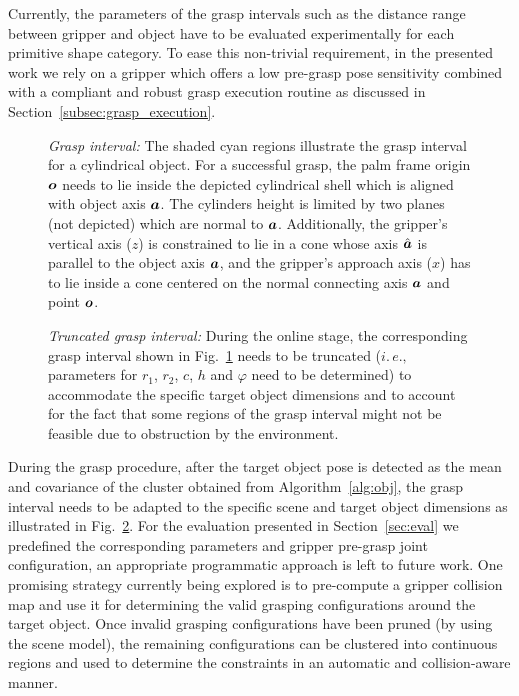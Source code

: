 Currently, the parameters of the grasp intervals such as the distance range between gripper and
object have to be evaluated experimentally for each primitive shape category. To ease this
non-trivial requirement, in the presented work we rely on a gripper which offers a low pre-grasp
pose sensitivity combined with a compliant and robust grasp execution routine as discussed in
Section~\ref{subsec:grasp_execution}.
%
\begin{figure}[t!] 
   \centering
     
    \caption{\textit{Grasp interval:} The shaded cyan regions illustrate the grasp interval for a
      cylindrical object. For a successful grasp, the palm frame origin $\mbox{\boldmath $o$}$ needs to lie
      inside the depicted cylindrical shell which is aligned with object axis $\mbox{\boldmath $a$}$. The
      cylinders height is limited by two planes (not depicted) which are normal to
      $\mbox{\boldmath $a$}$. Additionally, the gripper's vertical axis ($z$) is constrained to lie in a cone
      whose axis $\hat{\mbox{\boldmath $a$}}$ is parallel to the object axis $\mbox{\boldmath $a$}$, and the gripper's
      approach axis ($x$) has to lie inside a cone centered on the normal connecting axis $\mbox{\boldmath $a$}$
      and point $\mbox{\boldmath $o$}$.}
   \label{fig:grasp_interval}
   \vspace{-0.5cm}
\end{figure}
%
\begin{figure}[t!] 
   \centering
     
    \caption{\textit{Truncated grasp interval:} During the online stage, the corresponding grasp
      interval shown in Fig.~\ref{fig:grasp_interval} needs to be truncated ($i.\,e.,$ parameters
      for $r_1$, $r_2$, $c$, $h$ and $\varphi$ need to be determined) to accommodate the specific
      target object dimensions and to account for the fact that some regions of the grasp interval
      might not be feasible due to obstruction by the environment.}
   \label{fig:truncated_grasp_interval}
\end{figure}

During the grasp procedure, after the target object pose is detected as the mean and covariance of
the cluster obtained from Algorithm~\ref{alg:obj}, the grasp
interval needs to be adapted to the specific scene and target object dimensions as illustrated in
Fig.~\ref{fig:truncated_grasp_interval}. For the evaluation presented in Section~\ref{sec:eval} we
predefined the corresponding parameters and gripper pre-grasp joint configuration, an appropriate
programmatic approach is left to future work. 
One promising strategy currently being explored is to pre-compute a gripper collision map and use it for determining the valid grasping configurations around the target object. 
Once invalid grasping configurations have been pruned (by using the scene model), the remaining configurations can be clustered into continuous regions and used to determine the constraints in an automatic and collision-aware manner.
%
